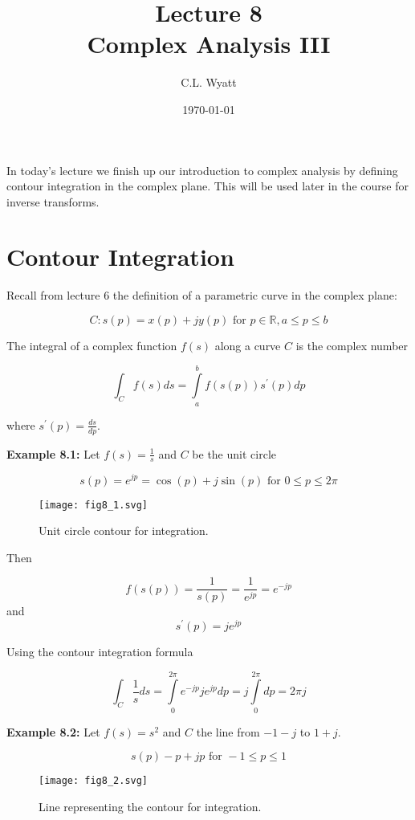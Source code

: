 \documentclass{article}
\begin{document}
\title{Lecture 8\\ Complex Analysis III}
\author{C.L. Wyatt}
\date{\today}
\maketitle

In today's lecture we finish up our introduction to complex analysis by defining contour integration in the complex plane. This will be used later in the course for inverse transforms.

\section{Contour Integration}

Recall from lecture 6 the definition of a parametric curve in the complex plane:

\[
C: s(p) = x(p) +jy(p) \text{ for } p\in\mathbb{R}, a \leq p \leq b
\]

The integral of a complex function $f(s)$ along a curve $C$ is the complex number

\[
\int_{C} f(s) ds = \int\limits_{a}^{b} f(s(p)) s^\prime(p) dp
\]

where $s^\prime(p) = \frac{ds}{dp}$.

\textbf{Example 8.1:} Let $f(s) = \frac{1}{s}$ and $C$ be the unit circle

\[
s(p) = e^{jp} = \cos(p) + j\sin(p) \text{ for } 0 \leq p \leq 2\pi
\]

\begin{figure}
  \centering
  \texttt{[image: fig8\_1.svg]}
  \caption{Unit circle contour for integration.}
\end{figure}

Then

\[
f\left(s(p)\right) = \frac{1}{s(p)} = \frac{1}{e^{jp}} = e^{-jp}
\]
and
\[
s^\prime(p) = je^{jp}
\]

Using the contour integration formula

\[
\int_C \frac{1}{s} ds = \int\limits_0^{2\pi} e^{-jp} j e^{jp} dp = j \int\limits_0^{2\pi} dp = 2\pi j 
\]

\textbf{Example 8.2:} Let $f(s) = s^2$ and $C$ the line from $-1-j$ to $1 + j$.

\[
s(p) - p + jp \text{ for } -1 \leq p \leq 1
\]

\begin{figure}
  \centering
  \texttt{[image: fig8\_2.svg]}
  \caption{Line representing the contour for integration.}
\end{figure}
\end{document}
